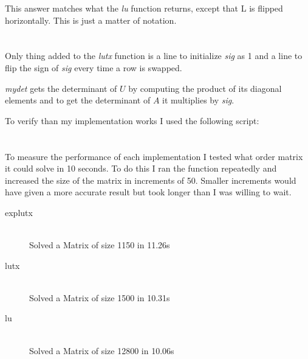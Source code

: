\documentclass[12pt]{article}
\begin{document}
This answer matches what the \textit{lu} function returns, except that L is flipped horizontally. This is just a matter of notation.


\section{} %

Only thing added to the \textit{lutx} function is a line to initialize \textit{sig} as 1 and a line to flip the sign of \textit{sig} every time a row is swapped.

\begin{minipage}{\linewidth}

\end{minipage}

\textit{mydet} gets the determinant of $U$ by computing the product of its diagonal elements and to get the determinant of $A$ it multiplies by \textit{sig}.

\begin{minipage}{\linewidth}

\end{minipage}

To verify than my implementation works I used the following script:

\begin{minipage}{\linewidth}

\end{minipage}

\section{} %

To measure the performance of each implementation I tested what order matrix it could solve in 10 seconds. To do this I ran the function repeatedly and increased the size of the matrix in increments of 50. Smaller increments would have given a more accurate result but took longer than I was willing to wait.

\begin{description}
	\item[explutx] \hfill \\
	Solved a Matrix of size 1150 in 11.26s
	\item[lutx] \hfill \\
	Solved a Matrix of size 1500 in 10.31s
	\item[lu] \hfill \\
	Solved a Matrix of size 12800 in 10.06s
\end{description}
\end{document}
